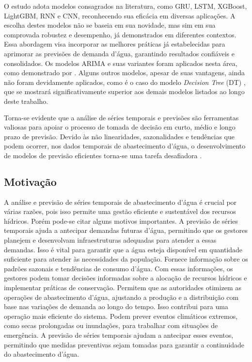 O estudo adota modelos consagrados na literatura, como GRU, LSTM, XGBoost, LightGBM, RNN e CNN, reconhecendo sua eficácia em diversas aplicações. A escolha destes modelos não se baseia em sua novidade, mas sim em sua comprovada robustez e desempenho, já demonstrados em diferentes contextos. Essa abordagem visa incorporar as melhores práticas já estabelecidas para aprimorar as previsões de demanda d'água, garantindo resultados confiáveis e consolidados. Os modelos ARIMA e suas variantes foram aplicados nesta área, como demonstrado por \cite{2-s2.0-85069459067, 2-s2.0-85099424908}. Alguns outros modelos, apesar de suas vantagens, ainda não foram devidamente aplicados, como é o caso do modelo \textit{Decision Tree} (DT) \cite{2-s2.0-85054695177}, que se mostrará significativamente superior aos demais modelos listados ao longo deste trabalho.

Torna-se evidente que a análise de séries temporais e previsões são ferramentas valiosas para apoiar o processo de tomada de decisão em curto, médio e longo prazo de previsão. Devido às não linearidades, sazonalidades e tendências que podem ocorrer, nos dados temporais de abastecimento d'água, o desenvolvimento de modelos de previsão eficientes torna-se uma tarefa desafiadora \cite{mateus}.



\subsection{Motiva\c c\~ao} 
\label{subsubsec:motivacao}

A análise e previsão de séries temporais de abastecimento d'água é crucial por várias razões, pois isso permite uma gestão eficiente e sustentável dos recursos hídricos. Porém pode-se citar alguns motivos importantes. A previsão de séries temporais ajuda a antecipar demandas futuras d'água, permitindo que os gestores planejem e desenvolvam infraestruturas adequadas para atender a essas demandas. Isso é vital para garantir que a água esteja disponível em quantidade suficiente para atender às necessidades da população. Fornece informação sobre os padrões sazonais e tendências de consumo d'água. Com essas informações, os gestores podem tomar decisões informadas sobre a alocação de recursos hídricos e implementar práticas de conservação. Permitem que as autoridades otimizem as operações de abastecimento d'água, ajustando a produção e a distribuição com base nas variações de demanda ao longo do tempo. Isso contribui para uma operação mais eficiente do sistema. Podem prever eventos climáticos extremos, como secas prolongadas ou inundações, para trabalhar com situações de emergência. A previsão de séries temporais ajudam a antecipar esses eventos, permitindo que medidas preventivas sejam tomadas para garantir a continuidade do abastecimento d'água.

